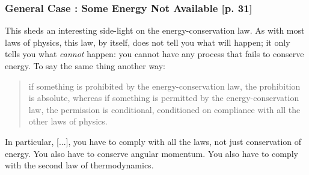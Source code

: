 \subsubsection{General Case : Some Energy Not Available [p. 31]}
%
This sheds an interesting side-light on the energy-conservation law. As with most laws of physics, this law, by itself, does not tell you what will happen; it only tells you what \emph{cannot} happen: you cannot have any process that fails to conserve energy. To say the same thing another way: 
%
\begin{quotation}
  if something is prohibited by the energy-conservation law, the prohibition is absolute, whereas if something is permitted by the energy-conservation law, the permission is conditional, conditioned on compliance with all the other laws of physics. 
\end{quotation}
%
In particular, [...], you have to comply with all the laws, not just conservation of energy. You also have to conserve angular momentum. You also have to comply with the second law of thermodynamics.
